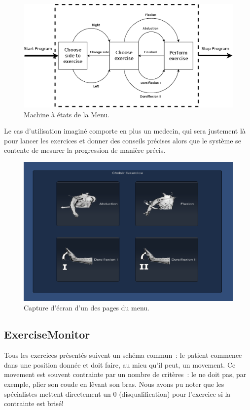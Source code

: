 \begin{figure}[h!]
\centering
\includegraphics[width=\linewidth]{images/menu}
\caption{Machine à états de la Menu.}
\end{figure}

Le cas d'utilisation imaginé comporte en plus un medecin, qui sera justement là
pour lancer les exercices et donner des conseils précises alors que le système 
se contente de mesurer la progression de manière précis.

\begin{figure}[h!]
\centering
\includegraphics[width=0.8\linewidth]{images/menu2}
\caption{Capture d'écran d'un des pages du menu.}
\end{figure}
    

\subsection{ExerciseMonitor}

Tous les exercices présentés suivent un schéma commun~: le patient commence dans
une position donnée et doit faire, au mieu qu'il peut, un movement. Ce movement
est souvent contrainte par un nombre de critères~: le ne doit pas, par exemple,
plier son coude en lêvant son bras. Nous avons pu noter que les spécialistes 
mettent directement un 0
(disqualification) pour l'exercice si la contrainte est brisé!

